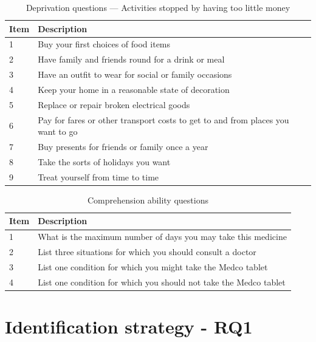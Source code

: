 \begin{table}[h!]
    \centering
    \caption{Deprivation questions --- Activities stopped by having too little money}
    \label{tab:deprivation}
    \begin{tabularx}{\textwidth}{lX}
        \toprule 
        Item & Description \\
        \midrule
        1 & Buy your first choices of food items \\
        2 & Have family and friends round for a drink or meal \\
        3 & Have an outfit to wear for social or family occasions \\
        4 & Keep your home in a reasonable state of decoration \\
        5 & Replace or repair broken electrical goods \\
        6 & Pay for fares or other transport costs to get to and from places you want to go \\
        7 & Buy presents for friends or family once a year \\
        8 & Take the sorts of holidays you want \\
        9 & Treat yourself from time to time \\
        \bottomrule
    \end{tabularx}
\end{table}


\begin{table}[h!]
    \centering
    \caption{Comprehension ability questions}
    \label{tab:comprehension}
    \begin{tabular}{ll}
        \toprule
        Item & Description \\
        \midrule
        1 & What is the maximum number of days you may take this medicine \\
        2 & List three situations for which you should consult a doctor \\
        3 & List one condition for which you might take the Medco tablet \\
        4 & List one condition for which you should not take the Medco tablet \\
        \bottomrule
    \end{tabular}
\end{table}


\section{Identification strategy - RQ1}

